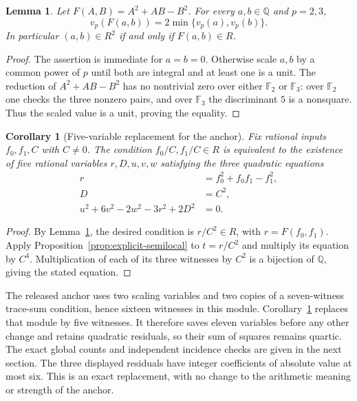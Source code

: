 \documentclass[11pt]{article}
\newtheorem{lemma}[theorem]{Lemma}
\newtheorem{corollary}[theorem]{Corollary}
\theoremstyle{definition}
\begin{document}
\begin{lemma}\label{lem:two-semilocal-inputs}
Let $F(A,B)=A^2+AB-B^2$. For every $a,b\in\mathbb Q$ and $p=2,3$,
\[
 v_p(F(a,b))=2\min\{v_p(a),v_p(b)\}.
\]
In particular $(a,b)\in R^2$ if and only if $F(a,b)\in R$.
\end{lemma}
\begin{proof}
The assertion is immediate for $a=b=0$. Otherwise scale $a,b$ by a
common power of $p$ until both are integral and at least one is a unit.
The reduction of $A^2+AB-B^2$ has no nontrivial zero over either
$\mathbb F_2$ or $\mathbb F_3$: over $\mathbb F_2$ one checks the
three nonzero pairs, and over $\mathbb F_3$ the discriminant $5$
is a nonsquare. Thus the scaled value is a unit, proving the equality.
\end{proof}

\begin{corollary}[Five-variable replacement for the anchor]
\label{cor:five-anchor}
Fix rational inputs $f_0,f_1,C$ with $C\ne0$. The condition
$f_0/C,f_1/C\in R$ is equivalent to the existence of five rational
variables $r,D,u,v,w$ satisfying the three quadratic equations
\begin{align*}
 r&=f_0^2+f_0f_1-f_1^2,\\
 D&=C^2,\\
 u^2+6v^2-2w^2-3r^2+2D^2&=0.
\end{align*}
\end{corollary}
\begin{proof}
By Lemma~\ref{lem:two-semilocal-inputs}, the desired condition is
$r/C^2\in R$, with $r=F(f_0,f_1)$. Apply
Proposition~\ref{prop:explicit-semilocal} to $t=r/C^2$ and multiply
its equation by $C^4$. Multiplication of each of its three witnesses
by $C^2$ is a bijection of $\mathbb Q$, giving the stated equation.
\end{proof}

The released anchor uses two scaling variables and two copies of a
seven-witness trace-sum condition, hence sixteen witnesses in this module.
Corollary~\ref{cor:five-anchor} replaces that module by five witnesses.
It therefore saves eleven variables before any other change and retains
quadratic residuals, so their sum of squares remains quartic. The exact global counts and independent incidence checks are given in the next section.
The three displayed residuals have integer coefficients of absolute value
at most six. This is an exact replacement, with no change to the arithmetic
meaning or strength of the anchor.
\end{document}
